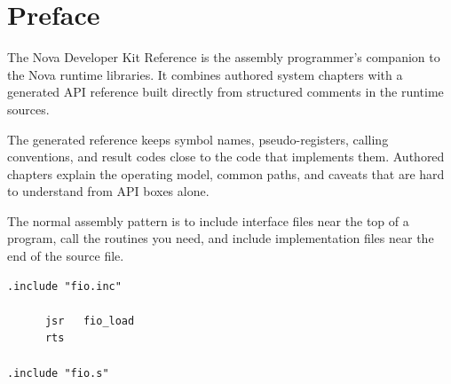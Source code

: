 \chapter*{Preface}

The Nova Developer Kit Reference is the assembly programmer's companion to the
Nova runtime libraries. It combines authored system chapters with a generated
API reference built directly from structured comments in the runtime sources.

\begin{novanote}
The generated reference keeps symbol names, pseudo-registers, calling
conventions, and result codes close to the code that implements them. Authored
chapters explain the operating model, common paths, and caveats that are hard to
understand from API boxes alone.
\end{novanote}

The normal assembly pattern is to include interface files near the top of a
program, call the routines you need, and include implementation files near the
end of the source file.

\begin{lstlisting}
.include "fio.inc"

      jsr   fio_load
      rts

.include "fio.s"
\end{lstlisting}
